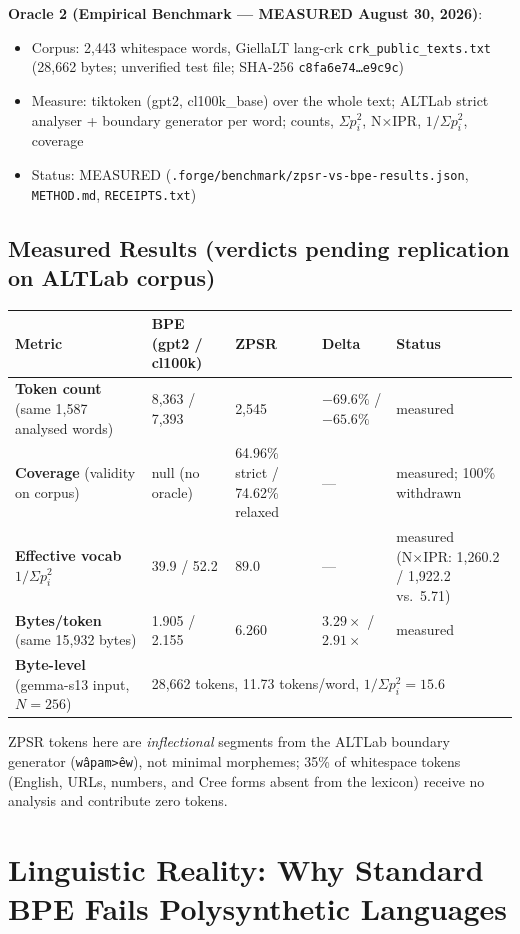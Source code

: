 \documentclass[11pt,oneside]{article}
\begin{document}
\textbf{Oracle 2 (Empirical Benchmark --- MEASURED August 30, 2026)}:
\begin{itemize}
  \item Corpus: 2,443 whitespace words, GiellaLT lang-crk \texttt{crk\_public\_texts.txt} (28,662 bytes; unverified test file; SHA-256 \texttt{c8fa6e74\ldots e9c9c})
  \item Measure: tiktoken (gpt2, cl100k\_base) over the whole text; ALTLab strict analyser + boundary generator per word; counts, $\Sigma p_i^2$, N×IPR, $1/\Sigma p_i^2$, coverage
  \item Status: MEASURED (\texttt{.forge/benchmark/zpsr-vs-bpe-results.json}, \texttt{METHOD.md}, \texttt{RECEIPTS.txt})
\end{itemize}

\subsection{Measured Results (verdicts pending replication on ALTLab corpus)}

\begin{center}
\begin{tabular}{lllll}
\toprule
Metric & BPE (gpt2 / cl100k) & ZPSR & Delta & Status \\
\midrule
\textbf{Token count} (same 1,587 analysed words) & 8,363 / 7,393 & 2,545 & $-69.6\%$ / $-65.6\%$ & measured \\
\textbf{Coverage} (validity on corpus) & null (no oracle) & 64.96\% strict / 74.62\% relaxed & --- & measured; 100\% withdrawn \\
\textbf{Effective vocab} $1/\Sigma p_i^2$ & 39.9 / 52.2 & 89.0 & --- & measured (N×IPR: 1,260.2 / 1,922.2 vs.\ 5.71) \\
\textbf{Bytes/token} (same 15,932 bytes) & 1.905 / 2.155 & 6.260 & $3.29\times$ / $2.91\times$ & measured \\
\textbf{Byte-level} (gemma-s13 input, $N{=}256$) & \multicolumn{4}{l}{28,662 tokens, 11.73 tokens/word, $1/\Sigma p_i^2 = 15.6$} \\
\bottomrule
\end{tabular}
\end{center}

ZPSR tokens here are \emph{inflectional} segments from the ALTLab boundary generator (\texttt{wâpam>êw}), not minimal morphemes; 35\% of whitespace tokens (English, URLs, numbers, and Cree forms absent from the lexicon) receive no analysis and contribute zero tokens.

\section{Linguistic Reality: Why Standard BPE Fails Polysynthetic Languages}
\end{document}

